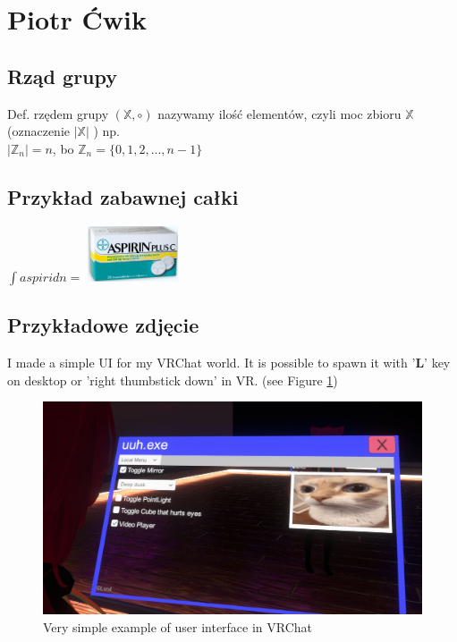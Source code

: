 \section{Piotr Ćwik}
\label{sec:lpcwik}

\subsection{Rząd grupy} 
Def. rzędem grupy $(\mathbb{X},\circ )$ nazywamy ilość elementów, czyli moc zbioru $\mathbb{X}$ (oznaczenie $|\mathbb{X}|$ ) np. \\
\begin{math} | \mathbb{Z}_n | = n \end{math}, bo \begin{math}\mathbb{Z}_n = \{0, 1, 2, ..., n-1\} \end{math} \\
\subsection{Przykład zabawnej całki}
$\int aspiri dn = $ \includegraphics[width=0.2\textwidth]{pictures/Piotr/tak.png}
\subsection{Przykładowe zdjęcie}
I made a simple UI for my VRChat world. It is possible to spawn it with '\textbf{L}' key on desktop or 'right thumbstick down' in VR. (see Figure \ref{fig:vrc1})\\
\begin{figure}[h]
    \centering
    \includegraphics[width=1\textwidth]{pictures/Piotr/VRC_UI1.jpg}
    \caption{Very simple example of user interface in VRChat}
    \label{fig:vrc1}
\end{figure}
\pagebreak

